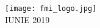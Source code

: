 \begin{titlepage}
	
	
	\texttt{[image: fmi\_logo.jpg]}\\[1cm] %
	
	\vfill %
	{\large IUNIE 2019}\\[3cm] %
	
	
\end{titlepage}